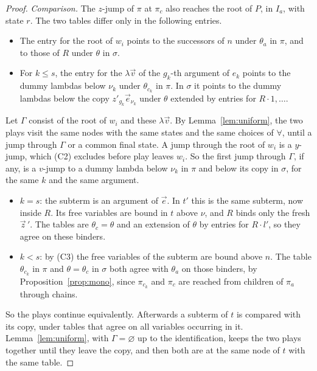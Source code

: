\documentclass[11pt]{article}
\newcommand{\suc}[2]{#1{\cdot}#2}
\theoremstyle{plain}
\theoremstyle{definition}
\theoremstyle{remark}
\begin{document}
\begin{proof}
\emph{Comparison.}  The $z$-jump of $\pi$ at $\pi_c$ also reaches the root
of $P$, in $I_a$, with state $r$.  The two tables differ only in the
following entries.
\begin{itemize}
\item The entry for the root of $w_i$ points to the successors of $n$
  under $\theta_a$ in $\pi$, and to those of $R$ under $\theta$ in
  $\sigma$.
\item For $k\le s$, the entry for the $\lambda\vec v$ of the $g_k$-th
  argument of $e_k$ points to the dummy lambdas below $\nu_k$ under
  $\theta_{c_k}$ in $\pi$.  In $\sigma$ it points to the dummy lambdas
  below the copy $z'_{g_k}\vec e_{\nu_k}$ under $\theta$ extended by
  entries for $\suc R1,\dots$.
\end{itemize}
Let $\Gamma$ consist of the root of $w_i$ and these $\lambda\vec v$.  By
Lemma~\ref{lem:uniform}, the two plays visit the same nodes with the
same states and the same choices of $\forall$, until a jump through
$\Gamma$ or a common final state.  A jump through the root of $w_i$ is a
$y$-jump, which (C2) excludes before play leaves $w_i$.  So the first
jump through $\Gamma$, if any, is a $v$-jump to a dummy lambda below
$\nu_k$ in $\pi$ and below its copy in $\sigma$, for the same $k$ and the
same argument.
\begin{itemize}
\item $k=s$: the subterm is an argument of $\vec e$.  In $t'$ this is the
  same subterm, now inside $R$.  Its free variables are bound in $t$
  above $\nu$, and $R$ binds only the fresh $\vec z\,'$.  The tables are
  $\theta_c=\theta$ and an extension of $\theta$ by entries for
  $\suc R{l'}$, so they agree on these binders.
\item $k<s$: by (C3) the free variables of the subterm are bound above
  $n$.  The table $\theta_{c_k}$ in $\pi$ and $\theta=\theta_c$ in
  $\sigma$ both agree with $\theta_a$ on those binders, by
  Proposition~\ref{prop:mono}, since $\pi_{c_k}$ and $\pi_c$ are reached
  from children of $\pi_a$ through chains.
\end{itemize}
So the plays continue equivalently.  Afterwards a subterm of $t$ is
compared with its copy, under tables that agree on all variables
occurring in it.  Lemma~\ref{lem:uniform}, with $\Gamma=\varnothing$ up
to the identification, keeps the two plays together until they leave
the copy, and then both are at the same node of $t$ with the same table.
\end{proof}
\end{document}
